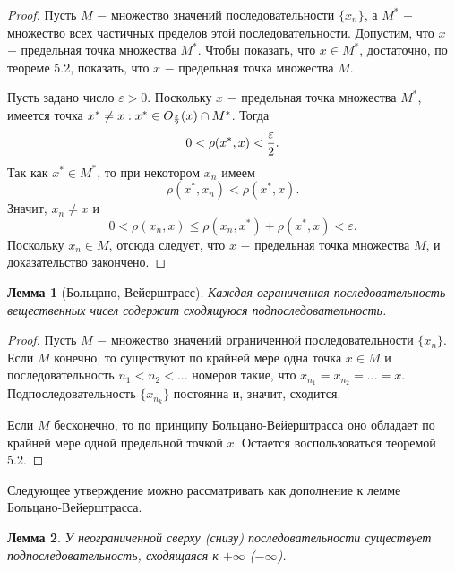 \documentclass{article}
\newtheorem*{lemma}{Лемма}
\begin{document}
\begin{proof}
Пусть \(M\) \(-\) множество значений последовательности \(\{x_n\}\), а \(M^{*}\) \(-\) множество всех частичных пределов этой последовательности. Допустим, что \(x\) \(-\) предельная точка множества \(M^{*}\). Чтобы показать, что \(x \in M^{*}\), достаточно, по теореме 5.2, показать, что \(x\) \(-\) предельная точка множества \(M\).

Пусть задано число \(\varepsilon > 0\). Поскольку \(x\) \(-\) предельная точка множества \(M^{*}\), имеется точка \(x^{*} \neq x : x^{*} \in O_{\varepsilon \over 2}(x) \cap M^{*}\). Тогда
\[
0 < \rho(x^{*}, x) < {\varepsilon \over 2}.
\]
Так как \(x^{*} \in M^{*}\), то при некотором \(x_n\) имеем
\[
\rho(x^{*}, x_n) < \rho(x^{*}, x).
\]
Значит, \(x_n \neq x\) и
\[
0 < \rho(x_n, x) \leq \rho(x_n, x^{*}) + \rho(x^{*}, x) < \varepsilon.
\]
Поскольку \(x_n \in M\), отсюда следует, что \(x\) \(-\) предельная точка множества \(M\), и доказательство закончено.
\end{proof}

\begin{lemma}[Больцано, Вейерштрасс]
Каждая ограниченная последовательность вещественных чисел содержит сходящуюся подпоследовательность.
\end{lemma}

\begin{proof}
Пусть \(M\) \(-\) множество значений ограниченной последовательности \(\{x_n\}\). Если \(M\) конечно, то существуют по крайней мере одна точка \(x \in M\) и последовательность \(n_1 < n_2 < ...\) номеров такие, что \(x_{n_1} = x_{n_2} = ... = x\). Подпоследовательность \(\{x_{n_k}\}\) постоянна и, значит, сходится.

Если \(M\) бесконечно, то по принципу Больцано-Вейерштрасса оно обладает по крайней мере одной предельной точкой \(x\). Остается воспользоваться теоремой 5.2.
\end{proof}

Следующее утверждение можно рассматривать как дополнение к лемме Больцано-Вейерштрасса.

\begin{lemma}
У неограниченной сверху (снизу) последовательности существует подпоследовательность, сходящаяся к \(+ \infty\) (\(- \infty\)).
\end{lemma}
\end{document}
